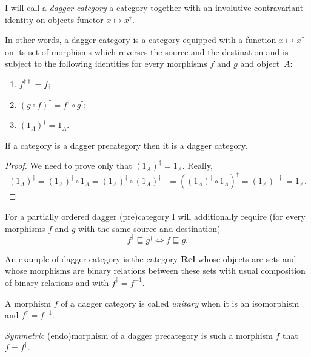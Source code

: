 \begin{defn}
I will call a \emph{dagger category} a category
together with an involutive contravariant identity-on-objects functor
$x\mapsto x^{\dagger}$.

In other words, a dagger category is a category equipped with a function
$x\mapsto x^{\dagger}$ on its set of morphisms which reverses the
source and the destination and is subject to the following identities
for every morphisms $f$ and $g$ and object~$A$:
\begin{enumerate}
\item $f^{\dagger\dagger}=f$;
\item $(g\circ f)^{\dagger}=f^{\dagger}\circ g^{\dagger}$;
\item $(1_{A})^{\dagger}=1_{A}$.
\end{enumerate}
\end{defn}
\begin{thm}
If a category is a dagger precategory then it is a dagger category.\end{thm}
\begin{proof}
We need to prove only that $(1_{A})^{\dagger}=1_{A}$. Really,
\[
(1_{A})^{\dagger}=(1_{A})^{\dagger}\circ1_{A}=(1_{A})^{\dagger}\circ(1_{A})^{\dagger\dagger}=((1_{A})^{\dagger}\circ1_{A})^{\dagger}=(1_{A})^{\dagger\dagger}=1_{A}.
\]

\end{proof}
For a partially ordered dagger (pre)category I will additionally require
(for every morphisms $f$ and $g$ with the same source and destination)
\[
f^{\dagger}\sqsubseteq g^{\dagger}\Leftrightarrow f\sqsubseteq g.
\]


An example of dagger category is the category $\mathbf{Rel}$ whose
objects are sets and whose morphisms are binary relations between
these sets with usual composition of binary relations and with $f^{\dagger}=f^{-1}$.
\begin{defn}
A morphism $f$ of a dagger category is called
\emph{unitary} when it is an isomorphism and $f^{\dagger}=f^{-1}$.
\end{defn}

\begin{defn}
\emph{Symmetric} (endo)morphism of a dagger
precategory is such a morphism $f$ that $f=f^{\dagger}$.
\end{defn}

